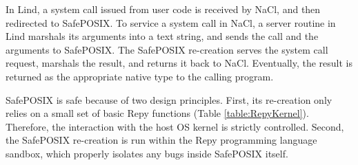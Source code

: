 {In Lind, a system call issued from user code is
received by NaCl, and then redirected to SafePOSIX.
To service a system call in NaCl, a server routine in
Lind marshals its arguments into a text string, and sends the call and the arguments
to SafePOSIX. The SafePOSIX re-creation serves the system call request, marshals the result, and
returns it back to NaCl. Eventually, the result is returned as the appropriate
native type to the calling program.

SafePOSIX is safe because of two design principles.
First, its re-creation only relies on a small set of basic Repy functions (Table \ref{table:RepyKernel}).
Therefore, the interaction with the host OS kernel is strictly controlled.
Second, the SafePOSIX re-creation is run within the Repy programming language sandbox,
which properly isolates any bugs inside SafePOSIX itself.




}
